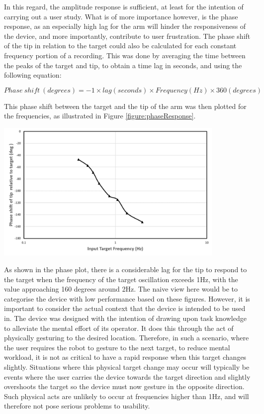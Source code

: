 \documentclass[11pt]{article}
\begin{document}
In this regard, the amplitude response is sufficient, at least for the intention of carrying out a user study. What is of more importance however, is the phase response, as an especially high lag for the arm will hinder the responsiveness of the device, and more importantly, contribute to user frustration. The phase shift of the tip in relation to the target could also be calculated for each constant frequency portion of a recording. This was done by averaging the time between the peaks of the target and tip, to obtain a time lag in seconds, and using the following equation:

\begin{equation}\label{equation:phaseShift}
Phase \ shift \ (degrees) = -1 \times lag(seconds)\times Frequency(Hz)\times 360(degrees)
\end{equation}

This phase shift between the target and the tip of the arm was then plotted for the frequencies, as illustrated in Figure \ref{figure:phaseResponse}.

\begin{center}
\includegraphics[width=0.83\textwidth]{images/phaseResponse2.png}
\label{figure:phaseResponse}
\end{center}

As shown in the phase plot, there is a considerable lag for the tip to respond to the target when the frequency of the target oscillation exceeds 1Hz, with the value approaching 160 degrees around 2Hz. The naive view here would be to categorise the device with low performance based on these figures. However, it is important to consider the actual context that the device is intended to be used in. The device was designed with the intention of drawing upon task knowledge to alleviate the mental effort of its operator. It does this through the act of physically gesturing to the desired location. Therefore, in such a scenario, where the user requires the robot to gesture to the next target, to reduce mental workload, it is not as critical to have a rapid response when this target changes slightly. Situations where this physical target change may occur will typically be events where the user carries the device towards the target direction and slightly overshoots the target so the device must now gesture in the opposite direction. Such physical acts are unlikely to occur at frequencies higher than 1Hz, and will therefore not pose serious problems to usability. 
\end{document}
